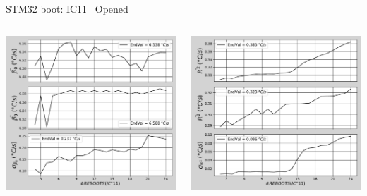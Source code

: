 \begin{frame}{STM32 boot: IC11 \textrightarrow\ Opened}
	\vspace{5mm}
	\begin{columns}
		\begin{column}{0.5\textwidth}
			\includegraphics[width=1.0\textwidth]{./figures/flistCircuit11_25_sl30beta0.pdf}
		\end{column}
		\begin{column}{0.5\textwidth}
			\includegraphics[width=1.0\textwidth]{./figures/flistCircuit11_25_sl30r2.pdf}
		\end{column}
	\end{columns}
\end{frame}

